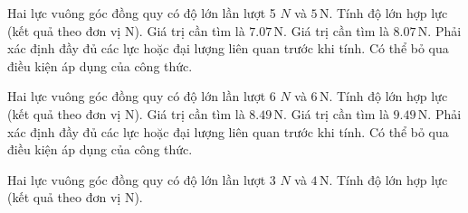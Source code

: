 \begin{ex}
Hai lực vuông góc đồng quy có độ lớn lần lượt 5 $N$ và $5\,\text{N}$. Tính độ lớn hợp lực (kết quả theo đơn vị N).
\choiceTF
{\True Giá trị cần tìm là $7.07\,\text{N}$.}
{Giá trị cần tìm là $8.07\,\text{N}$.}
{\True Phải xác định đầy đủ các lực hoặc đại lượng liên quan trước khi tính.}
{Có thể bỏ qua điều kiện áp dụng của công thức.}
\end{ex}

\begin{ex}
Hai lực vuông góc đồng quy có độ lớn lần lượt 6 $N$ và $6\,\text{N}$. Tính độ lớn hợp lực (kết quả theo đơn vị N).
\choiceTF
{\True Giá trị cần tìm là $8.49\,\text{N}$.}
{Giá trị cần tìm là $9.49\,\text{N}$.}
{\True Phải xác định đầy đủ các lực hoặc đại lượng liên quan trước khi tính.}
{Có thể bỏ qua điều kiện áp dụng của công thức.}
\end{ex}

\begin{ex}
Hai lực vuông góc đồng quy có độ lớn lần lượt 3 $N$ và $4\,\text{N}$. Tính độ lớn hợp lực (kết quả theo đơn vị N).
\end{ex}

